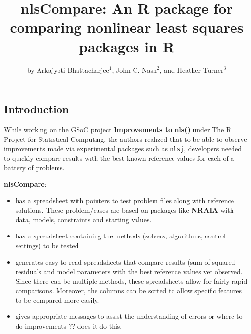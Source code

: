 \title{nlsCompare: An R package for comparing nonlinear least squares
packages in R}
\author{by Arkajyoti Bhattacharjee\(^1\), John C. Nash\(^2\), and Heather
Turner\(^3\)}

\maketitle


\hypertarget{introduction}{%
\subsection{Introduction}\label{introduction}}

While working on the GSoC project \textbf{Improvements to nls()} under
The R Project for Statistical Computing, the authors realized that to be
able to observe improvements made via experimental packages such as
\texttt{nlsj}, developers needed to quickly compare results with the
best known reference values for each of a battery of problems.

\textbf{nlsCompare}:

\begin{itemize}
\tightlist
\item
  has a spreadsheet with pointers to test problem files along with
  reference solutions. These problem/cases are based on packages like
  \textbf{NRAIA} with data, models, constraints and starting values.
\item
  has a spreadsheet containing the methods (solvers, algorithms, control
  settings) to be tested
\item
  generates easy-to-read spreadsheets that compare results (sum of
  squared residuals and model parameters with the best reference values
  yet observed. Since there can be multiple methods, these spreadsheets
  allow for fairly rapid comparisons. Moreover, the columns can be
  sorted to allow specific features to be compared more easily.
\item
  gives appropriate messages to assist the understanding of errors or
  where to do improvements ?? does it do this.
\end{itemize}

